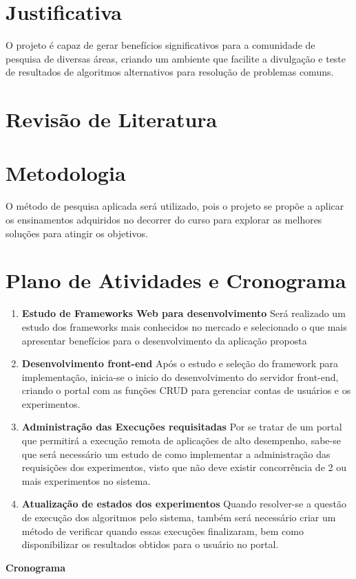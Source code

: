 \documentclass[12pt]{article}
\begin{document}
\section{Justificativa}
O projeto é capaz de gerar benefícios significativos para a comunidade de pesquisa de diversas áreas, criando um ambiente que facilite a divulgação e teste de resultados de algoritmos alternativos para resolução de problemas comuns.

\section{Revisão de Literatura}
\section{Metodologia}
O método de pesquisa aplicada será utilizado, pois o projeto se propõe a aplicar os ensinamentos adquiridos no decorrer do curso para explorar as melhores soluções para atingir os objetivos.

\section{Plano de Atividades e Cronograma}
\begin{enumerate}
\item \label{activity:frameworks} \textbf{Estudo de Frameworks Web para desenvolvimento}
Será realizado um estudo dos frameworks mais conhecidos no mercado e selecionado o que mais apresentar benefícios para o desenvolvimento da aplicação proposta
\item \label{activity:develop} \textbf{Desenvolvimento front-end}
Após o estudo e seleção do framework para implementação, inicia-se o inicio do desenvolvimento do servidor front-end, criando o portal com as funções CRUD para gerenciar contas de usuários e os experimentos.
\item \label{activity:exec} \textbf{Administração das Execuções requisitadas}
Por se tratar de um portal que permitirá a execução remota de aplicações de alto desempenho, sabe-se que será necessário um estudo de como implementar a administração das requisições dos experimentos, visto que não deve existir concorrência de 2 ou mais experimentos no sistema.
\item  \label{activity:updates} \textbf{Atualização de estados dos experimentos}
Quando resolver-se a questão de execução dos algoritmos pelo sistema, também será necessário criar um método de verificar quando essas execuções finalizaram, bem como disponibilizar os resultados obtidos para o usuário no portal.
\end{enumerate}
\textbf{Cronograma}
\end{document}
